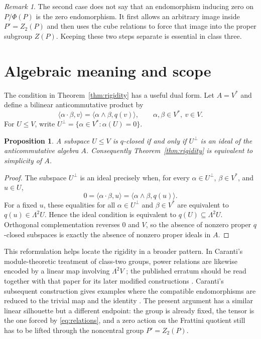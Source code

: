 \documentclass[11pt]{amsart}
\newtheorem{proposition}[theorem]{Proposition}
\theoremstyle{definition}
\theoremstyle{remark}
\newtheorem{remark}[theorem]{Remark}
\begin{document}
\begin{remark}\label{rem:notzero}
The second case does not say that an endomorphism inducing zero on
$P/\Phi(P)$ is the zero endomorphism.  It first allows an arbitrary image
inside $P'=Z_2(P)$ and then uses the cube relations to force that image
into the proper subgroup $Z(P)$.  Keeping these two steps separate is
essential in class three.
\end{remark}

\section{Algebraic meaning and scope}\label{sec:meaning}

The condition in Theorem~\ref{thm:rigidity} has a useful dual form.  Let
$A=V^*$ and define a bilinear anticommutative product by
\begin{equation}\label{eq:dualproduct}
 \langle \alpha\cdot\beta,v\rangle
   =\langle \alpha\wedge\beta,q(v)\rangle,
 \qquad \alpha,\beta\in V^*,\ v\in V.
\end{equation}
For $U\leq V$, write
$U^\perp=\{\alpha\in V^*: \alpha(U)=0\}$.

\begin{proposition}\label{prop:dual}
A subspace $U\leq V$ is $q$-closed if and only if $U^\perp$ is an ideal
of the anticommutative algebra $A$.  Consequently Theorem~\ref{thm:rigidity}
is equivalent to simplicity of $A$.
\end{proposition}

\begin{proof}
The subspace $U^\perp$ is an ideal precisely when, for every
$\alpha\in U^\perp$, $\beta\in V^*$, and $u\in U$,
\[
 0=\langle\alpha\cdot\beta,u\rangle
   =\langle\alpha\wedge\beta,q(u)\rangle.
\]
For a fixed $u$, these equalities for all $\alpha\in U^\perp$ and
$\beta\in V^*$ are equivalent to $q(u)\in\Lambda^2U$.  Hence the ideal
condition is equivalent to $q(U)\subseteq\Lambda^2U$.  Orthogonal
complementation reverses $0$ and $V$, so the absence of nonzero proper
$q$-closed subspaces is exactly the absence of nonzero proper ideals in
$A$.
\end{proof}

This reformulation helps locate the rigidity in a broader pattern.  In
Caranti's module-theoretic treatment of class-two groups, power relations
are likewise encoded by a linear map involving $\Lambda^2V$
\cite[Section~3]{Caranti15}; the published erratum should be read together
with that paper for its later modified constructions
\cite{CarantiErratum}.  Caranti's subsequent construction gives examples
where the compatible endomorphisms are reduced to the trivial map and the
identity \cite[Section~4]{Caranti16}.  The present argument has a similar
linear silhouette but a different endpoint: the group is already fixed,
the tensor is the one forced by \eqref{eq:relations}, and a zero action on
the Frattini quotient still has to be lifted through the noncentral group
$P'=Z_2(P)$.
\end{document}
